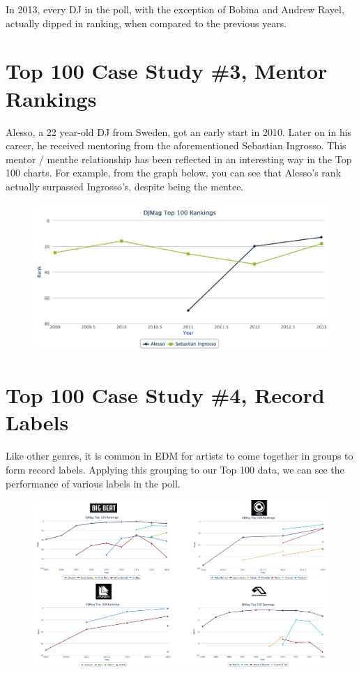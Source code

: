 \documentclass[12pt]{dalcsthesis}
\begin{document}
In 2013, every DJ in the poll, with the exception of Bobina and Andrew Rayel, actually dipped in ranking, when compared to the previous years.

\section{Top 100 Case Study \#3, Mentor Rankings}

Alesso, a 22 year-old DJ from Sweden, got an early start in 2010. Later on in his career, he received mentoring from the aforementioned Sebastian Ingrosso. This mentor / menthe relationship has been reflected in an interesting way in the Top 100 charts. For example, from the graph below, you can see that Alesso's rank actually surpassed Ingrosso's, despite being the mentee.

\begin{figure}[h]
\includegraphics[scale=.65]{alesso_seb_graph}
\centering
\end{figure}

\section{Top 100 Case Study \#4, Record Labels}

Like other genres, it is common in EDM for artists to come together in groups to form record labels. Applying this grouping to our Top 100 data, we can see the performance of various labels in the poll. \newpage

\begin{figure}[h]
\includegraphics[scale=.45]{label_graph}
\centering
\end{figure}
\end{document}
